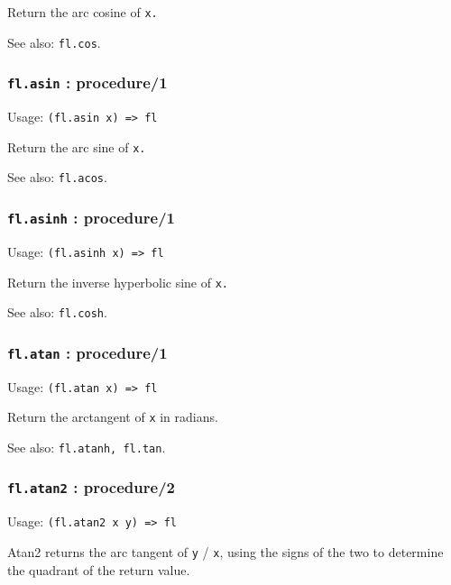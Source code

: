 \documentclass[
]{article}
\newcommand{\passthrough}[1]{#1}
\begin{document}
Return the arc cosine of \passthrough{\lstinline!x.!}

See also: \passthrough{\lstinline!fl.cos!}.

\hypertarget{fl.asin-procedure1}{%
\subsubsection{\texorpdfstring{\texttt{fl.asin} :
procedure/1}{fl.asin : procedure/1}}\label{fl.asin-procedure1}}

Usage: \passthrough{\lstinline!(fl.asin x) => fl!}

Return the arc sine of \passthrough{\lstinline!x.!}

See also: \passthrough{\lstinline!fl.acos!}.

\hypertarget{fl.asinh-procedure1}{%
\subsubsection{\texorpdfstring{\texttt{fl.asinh} :
procedure/1}{fl.asinh : procedure/1}}\label{fl.asinh-procedure1}}

Usage: \passthrough{\lstinline!(fl.asinh x) => fl!}

Return the inverse hyperbolic sine of \passthrough{\lstinline!x.!}

See also: \passthrough{\lstinline!fl.cosh!}.

\hypertarget{fl.atan-procedure1}{%
\subsubsection{\texorpdfstring{\texttt{fl.atan} :
procedure/1}{fl.atan : procedure/1}}\label{fl.atan-procedure1}}

Usage: \passthrough{\lstinline!(fl.atan x) => fl!}

Return the arctangent of \passthrough{\lstinline!x!} in radians.

See also: \passthrough{\lstinline!fl.atanh, fl.tan!}.

\hypertarget{fl.atan2-procedure2}{%
\subsubsection{\texorpdfstring{\texttt{fl.atan2} :
procedure/2}{fl.atan2 : procedure/2}}\label{fl.atan2-procedure2}}

Usage: \passthrough{\lstinline!(fl.atan2 x y) => fl!}

Atan2 returns the arc tangent of \passthrough{\lstinline!y!} /
\passthrough{\lstinline!x!}, using the signs of the two to determine the
quadrant of the return value.
\end{document}
